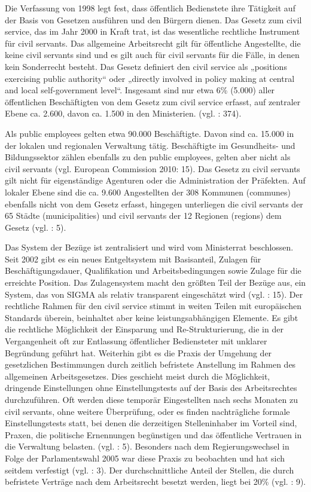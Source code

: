 Die Verfassung von 1998 legt fest, dass öffentlich Bedienstete ihre Tätigkeit auf der Basis von Gesetzen ausführen und den Bürgern dienen. Das Gesetz zum civil service, das im Jahr 2000 in Kraft trat, ist das wesentliche rechtliche Instrument für civil servants. Das allgemeine Arbeitsrecht gilt für öffentliche Angestellte, die keine civil servants sind und es gilt auch für civil servants für die Fälle, in denen kein Sonderrecht besteht. Das Gesetz definiert den civil service als „positions exercising public authority“ oder „directly involved in policy making at central and local self-government level“. Insgesamt sind nur etwa 6\% (5.000) aller öffentlichen Beschäftigten von dem Gesetz zum civil service erfasst, auf zentraler Ebene ca. 2.600, davon ca. 1.500 in den Ministerien. (vgl. \cite{skarica}: 374).\par
Als public employees gelten etwa 90.000 Beschäftigte. Davon sind ca. 15.000 in der lokalen und regionalen Verwaltung tätig. Beschäftigte im Gesundheits- und Bildungssektor zählen ebenfalls zu den public employees, gelten aber nicht als civil servants (vgl. European Commission 2010: 15). Das Gesetz zu civil servants gilt nicht für eigenständige Agenturen oder die Administration der Präfekten. Auf lokaler Ebene sind die ca. 9.600 Angestellten der 308 Kommunen (communes) ebenfalls nicht von dem Gesetz erfasst, hingegen unterliegen die civil servants der 65 Städte (municipalities) und civil servants der 12 Regionen (regions) dem Gesetz (vgl. \cite{oecd09}: 5).\par
Das System der Bezüge ist zentralisiert und wird vom Ministerrat beschlossen. Seit 2002 gibt es ein neues Entgeltsystem mit Basisanteil, Zulagen für Beschäftigungsdauer, Qualifikation und Arbeitsbedingungen sowie Zulage für die erreichte Position. Das Zulagensystem macht den größten Teil der Bezüge aus, ein System, das von SIGMA als relativ transparent eingeschätzt wird (vgl.  \cite{oecd09}: 15). Der rechtliche Rahmen für den civil service stimmt in weiten Teilen mit europäischen Standards überein, beinhaltet aber keine leistungsabhängigen Elemente. Es gibt die rechtliche Möglichkeit der Einsparung und Re-Strukturierung, die in der Vergangenheit oft zur Entlassung öffentlicher Bediensteter mit unklarer Begründung geführt hat. Weiterhin gibt es die Praxis der Umgehung der gesetzlichen Bestimmungen durch zeitlich befristete Anstellung im Rahmen des allgemeinen Arbeitsgesetzes. Dies geschieht meist durch die Möglichkeit, dringende Einstellungen ohne Einstellungstests auf der Basis des Arbeitsrechtes durchzuführen. Oft werden diese temporär Eingestellten nach sechs Monaten zu civil servants, ohne weitere Überprüfung, oder es finden nachträgliche formale Einstellungstests statt, bei denen die derzeitigen Stelleninhaber im Vorteil sind, Praxen, die politische Ernennungen begünstigen und das öffentliche Vertrauen in die Verwaltung belasten. (vgl. \cite{oecd11a}: 5). Besonders nach dem Regierungswechsel in Folge der Parlamentswahl 2005 war diese Praxis zu beobachten und hat sich seitdem verfestigt (vgl.  \cite{oecd09}: 3). Der durchschnittliche Anteil der Stellen, die durch befristete Verträge nach dem Arbeitsrecht besetzt werden, liegt bei 20\% (vgl. \cite{eurcom09b}: 9).\par
